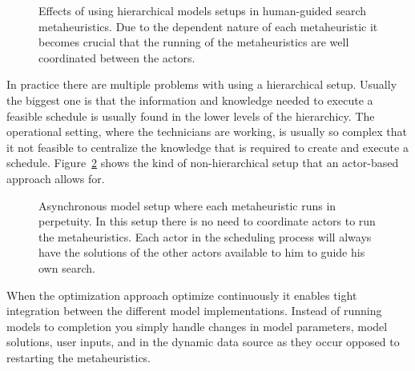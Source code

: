 \begin{figure}[H]
	
	\label{fig:discussion:hierarchical_model_setup}
	\caption{Effects of using hierarchical models setups in human-guided search metaheuristics.
	Due to the dependent nature of each metaheuristic it becomes crucial that the running of 
	the metaheuristics are well coordinated between the actors.}
\end{figure}

In practice there are multiple problems with using a hierarchical setup.
Usually the biggest one is that the information and knowledge needed to 
execute a feasible schedule is usually found in the lower levels of the 
hierarchicy. The operational setting, where the
technicians are working, is usually so complex that it not feasible to 
centralize the knowledge that is required to create and execute a 
schedule. Figure~\ref{fig:discussion:asynchronous_setup}
shows the kind of non-hierarchical setup that an actor-based approach 
allows for.

\begin{figure}[H]
	
	\caption{Asynchronous model setup where each metaheuristic runs in perpetuity. In this setup
	there is no need to coordinate actors to run the metaheuristics. Each actor in the 
	scheduling process will always have the solutions of the other actors available to 
	him to guide his own search.}
	\label{fig:discussion:asynchronous_setup}
\end{figure}

When the optimization approach optimize continuously it enables tight
integration between the different model implementations. Instead of running
models to completion you simply handle changes in model parameters, model
solutions, user inputs, and in the dynamic data source as they occur opposed to
restarting the metaheuristics.

